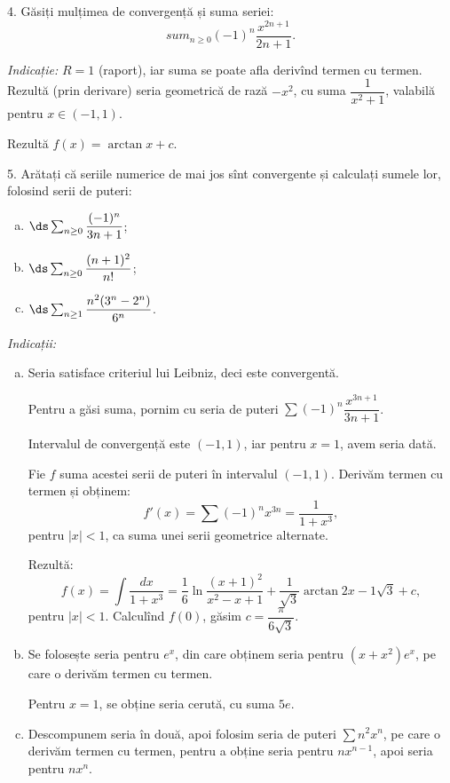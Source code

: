 4.  Găsiți mulțimea de convergență și suma seriei:
\[
  sum_{n \geq 0} (-1)^n \dfrac{x^{2n + 1}}{2n + 1}.
\]

\emph{Indicație:} $ R = 1 $ (raport), iar suma se poate afla derivînd
termen cu termen. Rezultă (prin derivare) seria geometrică de rază $ -x^2 $,
cu suma $ \dfrac{1}{x^2 + 1} $, valabilă pentru $ x \in (-1, 1) $.

Rezultă $ f(x) = \arctan x + c $.

\vspace{1cm}

5. Arătați că seriile numerice de mai jos sînt convergente și calculați
sumele lor, folosind serii de puteri:
\begin{enumerate}[(a)]
\item $ \ds\sum_{n \geq 0} \dfrac{(-1)^n}{3n + 1} $;
\item $ \ds\sum_{n \geq 0} \dfrac{(n+1)^2}{n!} $;
\item $ \ds\sum_{n \geq 1} \dfrac{n^2(3^n - 2^n)}{6^n} $.
\end{enumerate}

\emph{Indicații:}
\begin{enumerate}[(a)]
\item Seria satisface criteriul lui Leibniz, deci este convergentă.

  Pentru a găsi suma, pornim cu seria de puteri $ \sum (-1)^n \dfrac{x^{3n+1}}{3n+1} $.

  Intervalul de convergență este $ (-1, 1) $, iar pentru $ x = 1 $, avem
  seria dată.

  Fie $ f $ suma acestei serii de puteri în intervalul $ (-1, 1) $. Derivăm
  termen cu termen și obținem:
  \[
    f'(x) = \sum (-1)^n x^{3n} = \frac{1}{1 + x^3},
  \]
  pentru $ |x| < 1 $, ca suma unei serii geometrice alternate.

  Rezultă:
  \[
    f(x) = \int \frac{dx}{1 + x^3} = \frac{1}{6} \ln \frac{(x + 1)^2}{x^2 - x + 1} %
    + \frac{1}{\sqrt{3}} \arctan{2x - 1}{\sqrt{3}} + c,
  \]
  pentru $ |x| < 1 $. Calculînd $ f(0) $, găsim $ c = \dfrac{\pi}{6 \sqrt{3}} $.
\item Se folosește seria pentru $ e^x $, din care obținem seria pentru
  $ (x + x^2)e^x $, pe care o derivăm termen cu termen.

  Pentru $ x = 1 $, se obține seria cerută, cu suma $ 5e $.
\item Descompunem seria în două, apoi folosim seria de puteri $ \sum n^2 x^n $,
  pe care o derivăm termen cu termen, pentru a obține seria pentru $ nx^{n-1} $,
  apoi seria pentru $ nx^n $.
\end{enumerate}



